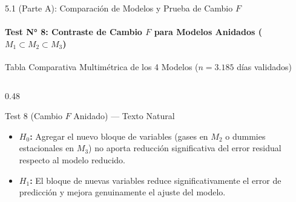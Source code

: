 \documentclass[aspectratio=169, 9pt]{beamer}
\begin{document}
\begin{frame}{5.1 (Parte A): Comparación de Modelos y Prueba de Cambio $F$}
\framesubtitle{Test N° 8: Contraste de Cambio $F$ para Modelos Anidados ($M_1 \subset M_2 \subset M_3$)}

\begin{block}{\footnotesize Tabla Comparativa Multimétrica de los 4 Modelos ($n = 3.185$ días validados)}
  \renewcommand{\arraystretch}{0.96}
\end{block}

\vspace{0.04cm}
\begin{columns}[T]
  \begin{column}{0.48\textwidth}
    \begin{alertblock}{\footnotesize Test 8 (Cambio $F$ Anidado) — Texto Natural}
      \scriptsize
      \begin{itemize}\setlength{\itemsep}{1pt}
        \item \textbf{$H_0$:} Agregar el nuevo bloque de variables (gases en $M_2$ o dummies estacionales en $M_3$) no aporta reducción significativa del error residual respecto al modelo reducido.
        \item \textbf{$H_1$:} El bloque de nuevas variables reduce significativamente el error de predicción y mejora genuinamente el ajuste del modelo.
      \end{itemize}
    \end{alertblock}
  \end{column}


\end{columns}
\end{frame}
\end{document}
